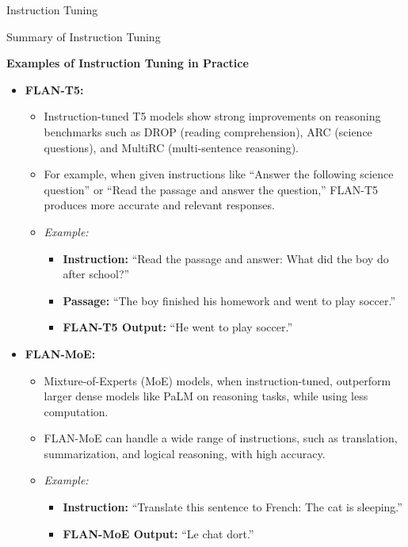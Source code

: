 \begin{frame}[allowframebreaks]{Instruction Tuning}
\begin{block}{Summary of Instruction Tuning}
\begin{itemize}
        \end{itemize}
    \end{block}
    \framebreak
    \textbf{Examples of Instruction Tuning in Practice}
        \begin{itemize}
            \item \textbf{FLAN-T5:}
            \begin{itemize}
                \item Instruction-tuned T5 models show strong improvements on reasoning benchmarks such as DROP (reading comprehension), ARC (science questions), and MultiRC (multi-sentence reasoning).
                \item For example, when given instructions like ``Answer the following science question'' or ``Read the passage and answer the question,'' FLAN-T5 produces more accurate and relevant responses.
                \item \textit{Example:}
                \begin{itemize}
                    \item \textbf{Instruction:} ``Read the passage and answer: What did the boy do after school?''
                    \item \textbf{Passage:} ``The boy finished his homework and went to play soccer.''
                    \item \textbf{FLAN-T5 Output:} ``He went to play soccer.''
                \end{itemize}
            \end{itemize}
            \framebreak
            \item \textbf{FLAN-MoE:}
            \begin{itemize}
                \item Mixture-of-Experts (MoE) models, when instruction-tuned, outperform larger dense models like PaLM on reasoning tasks, while using less computation.
                \item FLAN-MoE can handle a wide range of instructions, such as translation, summarization, and logical reasoning, with high accuracy.
                \item \textit{Example:}
                \begin{itemize}
                    \item \textbf{Instruction:} ``Translate this sentence to French: The cat is sleeping.''
                    \item \textbf{FLAN-MoE Output:} ``Le chat dort.''
                \end{itemize}

\end{itemize}
\end{itemize}
\end{frame}
